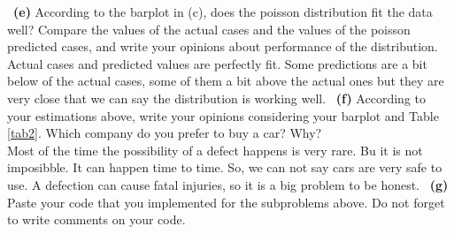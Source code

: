 \documentclass[a4 paper]{article}
\numberwithin{equation}{section}
\newcommand{\subproblem}[1]{~\newline\textbf{(#1)}}
\newcommand{\0}{\mathbf{0}}
\begin{document}
	
	\subproblem{e} According to the barplot in (c), does the poisson distribution fit the data well? Compare the values of the actual cases and the values of the poisson predicted cases, and write your opinions about performance of the distribution.\\
	Actual cases and predicted values are perfectly fit. Some predictions are a bit below of the actual cases, some of them a bit above the actual ones but they are very close that we can say the distribution is working well.
	\subproblem{f} According to your estimations above, write your opinions considering your barplot and Table \ref{tab2}. Which company do you prefer to buy a car? Why?\\
	Most of the time the possibility of a defect happens is very rare. Bu it is not imposibble. It can happen time to time. So, we can not say cars are very safe to use. A defection can cause fatal injuries, so it is a big problem to be honest.
	\subproblem{g} Paste your code that you implemented for the subproblems above. Do not forget to write comments on your code.\\
\end{document}
